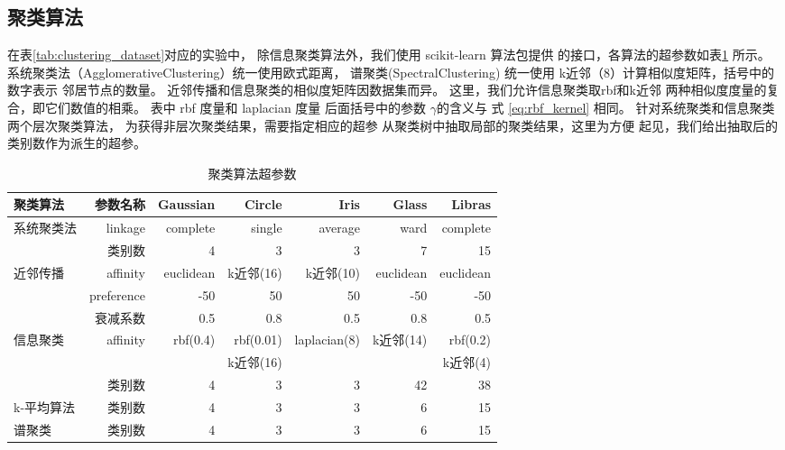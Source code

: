 \subsection{聚类算法}
在表\ref{tab:clustering_dataset}对应的实验中，
除信息聚类算法外，我们使用 scikit-learn 算法包提供
的接口，各算法的超参数如表\ref{tab:clustering_alg_hyperparameter}
所示。
系统聚类法（AgglomerativeClustering）统一使用欧式距离，
谱聚类(SpectralClustering)
统一使用 k近邻（8）计算相似度矩阵，括号中的数字表示
邻居节点的数量。
近邻传播和信息聚类的相似度矩阵因数据集而异。
这里，我们允许信息聚类取rbf和k近邻
两种相似度度量的复合，即它们数值的相乘。
表中 rbf 度量和 laplacian 度量
后面括号中的参数 $\gamma$的含义与
式 \ref{eq:rbf_kernel} 相同。
针对系统聚类和信息聚类两个层次聚类算法，
为获得非层次聚类结果，需要指定相应的超参
从聚类树中抽取局部的聚类结果，这里为方便
起见，我们给出抽取后的类别数作为派生的超参。

\begin{table}[!ht]
  \begin{adjustbox}{width=\columnwidth,center}
  \begin{tabular}{|l|r|r|r|r|r|r|}
  \hline
   聚类算法  &   参数名称 & Gaussian &   Circle &   Iris &   Glass &   Libras \\
  \hline
   \multirow{2}{*}{系统聚类法}  &  linkage     &   complete&     single &   average
   & ward &   complete \\
   \cline{2-7}
   & 类别数 & 4 & 3 & 3 & 7 & 15 \\
   \hline
   \multirow{3}{*}{近邻传播}  &    affinity & euclidean &  k近邻(16)
   &  k近邻(10)
   & euclidean &   euclidean \\
   \cline{2-7}
   & preference & -50 & 50 & 50 &
   -50 & -50\\
   \cline{2-7}
   & 衰减系数 & 0.5 & 0.8 & 0.5 & 0.8 & 0.5 \\
   \hline
   \multirow{2}{*}{信息聚类}  & 
   \multirow{2}{*}{affinity}      &       rbf(0.4) &    rbf(0.01)&  laplacian(8) & k近邻(14) &   rbf(0.2) \\
   & & &  k近邻(16)  & && k近邻(4)\\
   \cline{2-7}
   & 类别数 & 4 & 3 & 3 & 42 & 38\\
   \hline
   k-平均算法     &     类别数    &
   4 &    3 &  3 &   6 &    15 \\
   \hline
   谱聚类   &    类别数 & 4 &   3 &    3 &   6 &    15 \\
  \hline
  \end{tabular}
  \end{adjustbox}
\caption{聚类算法超参数}\label{tab:clustering_alg_hyperparameter}
\end{table}


